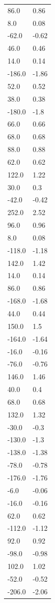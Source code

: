 \begin{longtable}{ll}
86.0 & 0.86 \\
8.0 & 0.08 \\
-62.0 & -0.62 \\
46.0 & 0.46 \\
14.0 & 0.14 \\
-186.0 & -1.86 \\
52.0 & 0.52 \\
38.0 & 0.38 \\
-180.0 & -1.8 \\
66.0 & 0.66 \\
68.0 & 0.68 \\
88.0 & 0.88 \\
62.0 & 0.62 \\
122.0 & 1.22 \\
30.0 & 0.3 \\
-42.0 & -0.42 \\
252.0 & 2.52 \\
96.0 & 0.96 \\
8.0 & 0.08 \\
-118.0 & -1.18 \\
142.0 & 1.42 \\
14.0 & 0.14 \\
86.0 & 0.86 \\
-168.0 & -1.68 \\
44.0 & 0.44 \\
150.0 & 1.5 \\
-164.0 & -1.64 \\
-16.0 & -0.16 \\
-76.0 & -0.76 \\
146.0 & 1.46 \\
40.0 & 0.4 \\
68.0 & 0.68 \\
132.0 & 1.32 \\
-30.0 & -0.3 \\
-130.0 & -1.3 \\
-138.0 & -1.38 \\
-78.0 & -0.78 \\
-176.0 & -1.76 \\
-6.0 & -0.06 \\
-16.0 & -0.16 \\
62.0 & 0.62 \\
-112.0 & -1.12 \\
92.0 & 0.92 \\
-98.0 & -0.98 \\
102.0 & 1.02 \\
-52.0 & -0.52 \\
-206.0 & -2.06 \\

\end{longtable}
